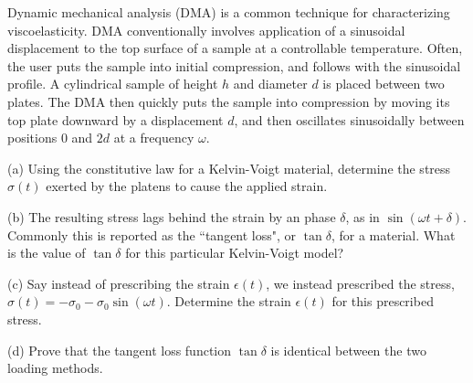 Dynamic mechanical analysis (DMA) is a common technique for characterizing viscoelasticity. 
DMA conventionally involves application of a sinusoidal displacement to the top surface of a sample at a controllable temperature. 
Often, the user puts the sample into initial compression, and follows with the sinusoidal profile. 
A cylindrical sample of height $h$ and diameter $d$ is placed between two plates.
The DMA then quickly puts the sample into compression by moving its top plate downward by a displacement $d$, and then oscillates sinusoidally between positions $0$ and $2d$ at a frequency $\omega$.

\medskip
(a) Using the constitutive law for a Kelvin-Voigt material, determine the stress $\sigma(t)$ exerted by the platens to cause the applied strain. 

\medskip
(b) The resulting stress lags behind the strain by an phase $\delta$, as in $\sin(\omega t + \delta)$. 
Commonly this is reported as the ``tangent loss", or $\tan\delta$, for a material. 
What is the value of $\tan\delta$ for this particular Kelvin-Voigt model?

\medskip
(c) Say instead of prescribing the strain $\epsilon(t)$, we instead prescribed the stress, $\sigma(t) = - \sigma_0 - \sigma_0 \sin(\omega t)$. 
Determine the strain $\epsilon(t)$ for this prescribed stress.

\medskip
(d) Prove that the tangent loss function $\tan\delta$ is identical between the two loading methods.

